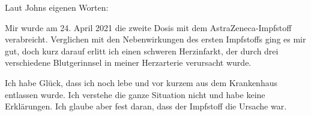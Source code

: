 Laut Johns eigenen Worten:

Mir wurde am 24. April 2021 die zweite Dosis mit dem AstraZeneca-Impfstoff
verabreicht. Verglichen mit den Nebenwirkungen des ersten Impfstoffs ging es mir
gut, doch kurz darauf erlitt ich einen schweren Herzinfarkt, der durch drei
verschiedene Blutgerinnsel in meiner Herzarterie verursacht wurde.

Ich habe Glück, dass ich noch lebe und vor kurzem aus dem Krankenhaus entlassen
wurde. Ich verstehe die ganze Situation nicht und habe keine Erklärungen. Ich
glaube aber fest daran, dass der Impfstoff die Ursache war.
